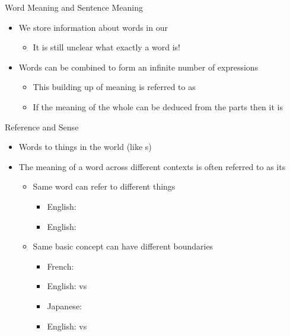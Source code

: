 \documentclass{beamer}
\begin{document}
\begin{frame}{Word Meaning and Sentence Meaning}

\begin{itemize}
\item We store information about words in our 
  \begin{itemize}
  \item It is still unclear what exactly a word is!
  \end{itemize}
\item Words can be combined to form an infinite number of expressions
  \begin{itemize}
  \item This building up of meaning is referred to as 
  \item If the meaning of the whole can be deduced from the parts then it is 
  \end{itemize}
\end{itemize}
\end{frame}

\begin{frame}{Reference and Sense}

\begin{itemize}
\item Words  to things in the world (like s)
\item The meaning of a word across different contexts is often referred to as its 
  \begin{itemize}
  \item Same word can refer to different things
    \begin{itemize}
    \item English: 
    \item English: 
    \end{itemize}
  \item Same basic concept can have different boundaries
    \begin{itemize}
    \item French: 
    \item English:  vs 
      
    \item Japanese: 
    \item English:  vs 
    \end{itemize}
  \end{itemize}
\end{itemize}



\end{frame}
\end{document}

